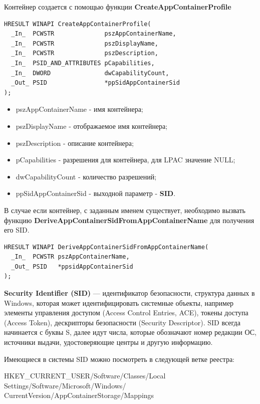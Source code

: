 Контейнер создается с помощью функции \textbf{CreateAppContainerProfile}\cite{CreateAppContainerProfile}
\begin{lstlisting}[language={}, caption={Прототип CreateAppContainerProfile}]
HRESULT WINAPI CreateAppContainerProfile(
  _In_  PCWSTR              pszAppContainerName,
  _In_  PCWSTR              pszDisplayName,
  _In_  PCWSTR              pszDescription,
  _In_  PSID_AND_ATTRIBUTES pCapabilities,
  _In_  DWORD               dwCapabilityCount,
  _Out_ PSID                *ppSidAppContainerSid
);
\end{lstlisting}
\begin{itemize}
\item pszAppContainerName - имя контейнера;
\item pszDisplayName - отображаемое имя контейнера;
\item pszDescription - описание контейнера;
\item pCapabilities - разрешения для контейнера, для LPAC значение NULL;
\item dwCapabilityCount - количество разрешений;
\item ppSidAppContainerSid - выходной параметр - \textbf{SID}.
\end{itemize}
В случае если контейнер, с заданным именем существует, необходимо вызвать функцию \textbf{DeriveAppContainerSidFromAppContainerName}\cite{DeriveAppContainerSidFromAppContainerName} для получения его SID.
\begin{lstlisting}[language={}, caption={Прототип DeriveAppContainerSidFromAppContainerName}]
HRESULT WINAPI DeriveAppContainerSidFromAppContainerName(
  _In_  PCWSTR pszAppContainerName,
  _Out_ PSID   *ppsidAppContainerSid
);
\end{lstlisting}
\textbf{Security Identifier (SID)} — идентификатор безопасности, структура данных в Windows, которая может идентифицировать системные объекты, например элементы управления доступом (Access Control Entries, ACE), токены доступа (Access Token), дескрипторы безопасности (Security Descriptor). SID всегда начинается с буквы S, далее идут числа, которые обозначают номер редакции ОС, источники выдачи, удостоверяющие центры и другую информацию.

Имеющиеся в системы SID можно посмотреть в следующей ветке реестра:
\begin{center}
HKEY\_CURRENT\_USER/Software/Classes/Local Settings/Software/Microsoft/Windows/ CurrentVersion/AppContainerStorage/Mappings
\end{center}

